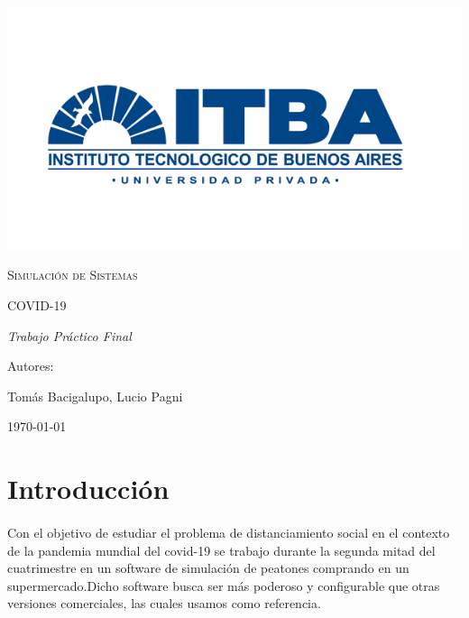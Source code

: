 \documentclass{article}
\author{Tomás Bacigalupo , Lucio Pagni}
\date{\today}
\author{Tomás Bacigalupo y Lucio Pagni}
\date{18/07/2020} %
\begin{document}
\begin{titlepage}
\centering
{\includegraphics[width=1\textwidth]{./images/logoitba.png}\par}
\vspace{1cm}
{\scshape\Large Simulaci\'on de Sistemas \par}
\vspace{3cm}
{\scshape\Huge COVID-19\par}
\vspace{3cm}
{\itshape\Large Trabajo Pr\'actico Final \par}
\vfill
{\Large Autores: \par}
{\Large Tomás Bacigalupo, Lucio Pagni\par}
\vfill
{\Large \today \par}
\end{titlepage}
\clearpage

\listoffigures   %
\clearpage
\listoftables %
 \clearpage

\tableofcontents
\clearpage

\section{Introducción}

\paragraph{}
Con el objetivo de estudiar el problema de distanciamiento social en el contexto de la pandemia mundial del covid-19 se trabajo durante la segunda mitad del cuatrimestre en un software de simulación de peatones comprando en un supermercado.Dicho software busca ser más poderoso y configurable que otras versiones comerciales, las cuales usamos como referencia. 
\end{document}

